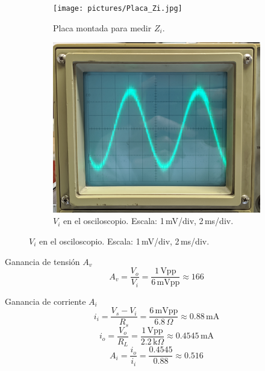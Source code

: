 \begin{frame}{}
  \noindent
  \begin{figure}[!ht]
  \centering
  \begin{subfigure}[t]{0.49\linewidth}
    \centering
    \texttt{[image: pictures/Placa\_Zi.jpg]}
    \caption{Placa montada para medir $Z_i$.}
  \end{subfigure}
  \hfill
  \begin{subfigure}[t]{0.49\linewidth}
    \centering
    \includegraphics[height=0.45\textheight]{pictures/Medicion Vi.jpg}
    \caption{$V_i$ en el osciloscopio. Escala: 1\,mV/div, 2\,ms/div.}
  \end{subfigure}
\end{figure}
\end{frame}


\begin{frame}{}

\begin{block}{Ganancia de tensión $A_v$}
\[
A_v = \frac{V_o}{V_i} = \frac{1\,\text{Vpp}}{6\,\text{mVpp}} \approx 166
\]
\end{block}

\begin{block}{Ganancia de corriente $A_i$}
\[
i_i = \frac{V_s - V_i}{R_s} = \frac{6\,\text{mVpp}}{6.8\,\Omega} \approx 0.88\,\text{mA}
\]
\[
i_o = \frac{V_o}{R_L} = \frac{1\,\text{Vpp}}{2.2\,\text{k}\Omega} \approx 0.4545\,\text{mA}
\]
\[
A_i = \frac{i_o}{i_i} = \frac{0.4545}{0.88} \approx 0.516
\]
\end{block}


\end{frame}



